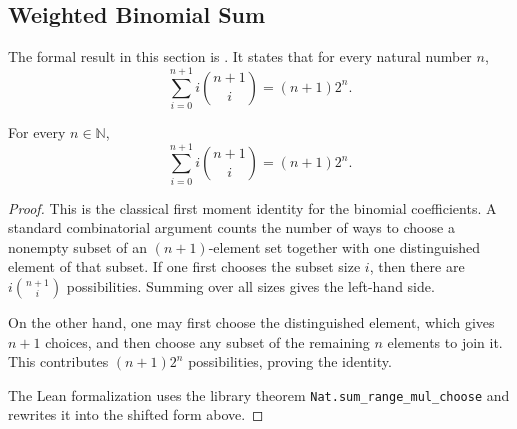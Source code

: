 
\subsection{Weighted Binomial Sum}

The formal result in this section is
. It states that for
every natural number $n$,
\[
  \sum_{i=0}^{n+1} i \binom{n+1}{i} = (n+1) 2^n.
\]

\begin{theorem}
For every $n \in \mathbb{N}$,
\[
  \sum_{i=0}^{n+1} i \binom{n+1}{i} = (n+1) 2^n.
\]
\end{theorem}

\begin{proof}
This is the classical first moment identity for the binomial coefficients. A
standard combinatorial argument counts the number of ways to choose a nonempty
subset of an $(n+1)$-element set together with one distinguished element of
that subset. If one first chooses the subset size $i$, then there are
$i\binom{n+1}{i}$ possibilities. Summing over all sizes gives the left-hand
side.

On the other hand, one may first choose the distinguished element, which gives
$n+1$ choices, and then choose any subset of the remaining $n$ elements to join
it. This contributes $(n+1)2^n$ possibilities, proving the identity.

The Lean formalization uses the library theorem
\texttt{Nat.sum\_range\_mul\_choose} and rewrites it into the shifted form above.
\end{proof}
